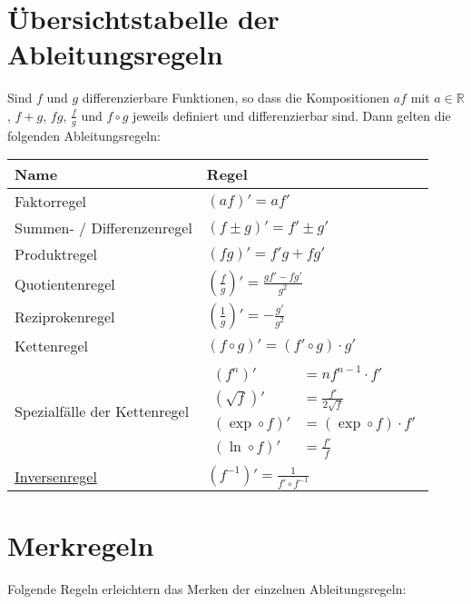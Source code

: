 \documentclass[fontsize=9pt,
               parskip=half-,
               DIV=14,
               listof=chapterentry,
               tocflat]{scrbook}
\begin{document}
\section{Übersichtstabelle der Ableitungsregeln}

Sind $f$ und $g$ differenzierbare Funktionen, so dass die Kompositionen $af$ mit $a\in \mathbb {R} $, $f+g$, $fg$, ${\tfrac {f}{g}}$ und $f\circ g$ jeweils definiert und differenzierbar sind. Dann gelten die folgenden Ableitungsregeln:


\renewcommand{\arraystretch}{1.5}

\begin{longtabu} to \linewidth {X[l]X[l]} \\ \toprule 
Name & Regel \\ 
\midrule
Faktorregel & $(af)'=af'$ \\ 
Summen- / Differenzenregel & $(f\pm g)'=f'\pm g'$ \\ 
Produktregel & $(fg)'=f'g+fg'$ \\ 
Quotientenregel & $\left({\frac {f}{g}}\right)'={\frac {gf'-fg'}{g^{2}}}$ \\ 
Reziprokenregel & $\left({\frac {1}{g}}\right)'=-{\frac {g'}{g^{2}}}$ \\ 
Kettenregel & $(f\circ g)'=(f'\circ g)\cdot g'$ \\ 
Spezialfälle der Kettenregel & ${\begin{aligned}(f^{n})'&=nf^{n-1}\cdot f'\\({\sqrt {f}})'&={\frac {f'}{2{\sqrt {f}}}}\\(\exp \circ f)'&=(\exp \circ f)\cdot f'\\(\ln \circ f)'&={\tfrac {f'}{f}}\end{aligned}}$ \\ 
\href{https://de.wikibooks.org/wiki/Mathe\_für\_Nicht-Freaks:\_Ableitung\_der\_Umkehrfunktion}
{Inversenregel} & $(f^{-1})'={\tfrac {1}{f'\circ f^{-1}}}$ \\ 
\bottomrule
\end{longtabu}
\renewcommand{\arraystretch}{1.0}
\section{Merkregeln}

Folgende Regeln erleichtern das Merken der einzelnen Ableitungsregeln:
\end{document}

